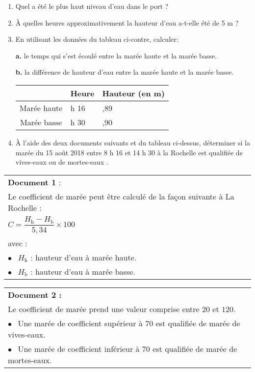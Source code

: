 \documentclass[10pt]{article}
\begin{document}
\begin{enumerate}
\item Quel a été le plus haut niveau d'eau dans le port ?
\item À quelles heures approximativement la hauteur d'eau a-t-elle été de 5 m ?
\item En utilisant les données du tableau ci-contre, calculer:

\parbox{0.43\linewidth}{
\textbf{a.} le temps qui s'est écoulé entre la marée haute et la marée basse.

\textbf{b.} la différence de hauteur d'eau entre la marée
haute et la marée basse.} \hfill
\parbox{0.55\linewidth}{\begin{tabularx}{\linewidth}{|c|*{2}{>{\centering \arraybackslash}X|}}\cline{2-3}
\multicolumn{1}{c|}{~}	&Heure	&\small Hauteur (en m)\\ \hline
Marée haute 			&8 h 16 &5,89\\ \hline
Marée basse 			&14 h 30&0,90\\ \hline
\end{tabularx}
}

\item  À l'aide des deux documents suivants et du tableau ci-dessus, déterminer si la marée du 15 août 2018 entre 8 h 16 et 14 h 30 à la Rochelle est qualifiée de \og vives-eaux \fg ou de \og mortes-eaux \fg .
\end{enumerate}

\parbox{0.48\linewidth}{
\begin{tabularx}{\linewidth}{|X|}\hline
\textbf{Document 1} :\\
Le coefficient de marée peut être calculé de la façon suivante à La Rochelle :\\
$C = \dfrac{H_{\text{h}} - H_{\text{b}}}{5,34} \times 100$\\
avec :\\
\hspace{1cm}$\bullet~~$ $H_{\text{h}}$ : hauteur d'eau à marée haute.\\
\hspace{1cm}$\bullet~~$ $H_{\text{b}}$  : hauteur d'eau à marée basse.\\ \hline
\end{tabularx}
}\hfill
\parbox{0.48\linewidth}{
\begin{tabularx}{\linewidth}{|X|}\hline
\textbf{Document 2 :}\\
Le coefficient de marée prend une valeur comprise entre $20$ et $120$.\\
\hspace{1cm}$\bullet~~$ Une marée de coefficient supérieur à 70 est qualifiée de marée de
vives-eaux.\\
\hspace{1cm}$\bullet~~$ Une marée de coefficient inférieur à
70 est qualifiée de marée de mortes-eaux.\\ \hline
\end{tabularx}
}
\end{document}
